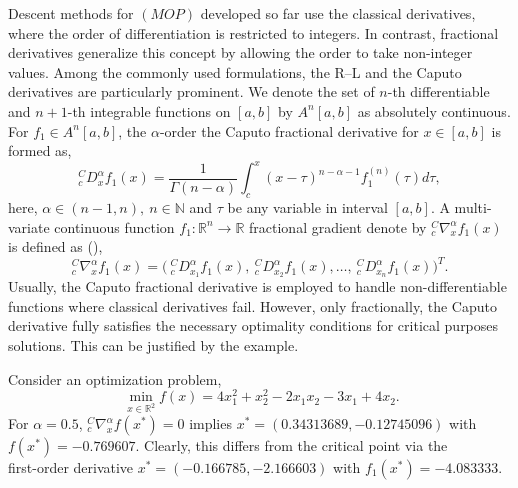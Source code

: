 \documentclass[smallextended,referee,envcountsect]{svjour3}
\begin{document}



\par Descent methods for $(MOP)$ developed so far use the classical derivatives, where the order of differentiation is restricted to integers. In contrast, fractional derivatives generalize this concept by allowing the order to take non-integer values. Among the commonly used formulations, the R–L and the Caputo derivatives are particularly prominent. We denote the set of $n$-th differentiable and $n+1$-th integrable functions on $[a,b]$ by $A^n[a,b]$ as absolutely continuous. For $f_1\in A^n[a,b]$, the  $\alpha$-order the Caputo fractional derivative for $x\in[a,b]$ is formed as,
  $$^C_cD^{\alpha}_xf_1(x) = \frac{1}{\Gamma(n-\alpha)}  \int_{c}^{x}(x-\tau) ^{n-\alpha-1} f_1^{(n)}(\tau)d\tau,$$
here, $\alpha\in(n-1,n), ~n\in  \mathbb{N}$ and $\tau$ be any variable in interval $[a,b]$. A multi-variate continuous function $f_1:\mathbb{R}^n \rightarrow\mathbb{R}$ fractional gradient denote by $^C_c\nabla^{\alpha}_xf_1(x)$ is defined as (\cite{38}),
 \begin{equation*}
     ^C_c\nabla^{\alpha}_xf_1(x) =\Big(~
         ^C_cD^{\alpha}_{x_1}f_1(x), ~
         ^C_cD^{\alpha}_{x_2}f_1(x), \dots,~ ^C_cD^{\alpha}_{x_n}f_1(x)\Big)^T.
 \end{equation*}   
Usually, the Caputo fractional derivative is employed to handle non-differentiable functions where classical derivatives fail. However, only fractionally, the Caputo derivative fully satisfies the necessary optimality conditions for critical purposes solutions. This can be justified by the example.
\begin{example}
Consider an optimization problem,
$$~ \underset{x\in\mathbb{R}^2}{\min} f(x)= 4x_1^2 + x_2^2 - 2x_1 x_2 -3 x_1 + 4x_2.
$$
For $\alpha=0.5$, $ ^C_c\nabla^{\alpha}_xf(x^*)=0$ implies $x^*=(0.34313689, -0.12745096)$ with $f(x^*)=-0.769607$. Clearly, this differs from the critical point via the \\first-order derivative $x^*=(-0.166785, -2.166603)$ with $f_1(x^*)=-4.083333$.
\end{example}
\end{document}
